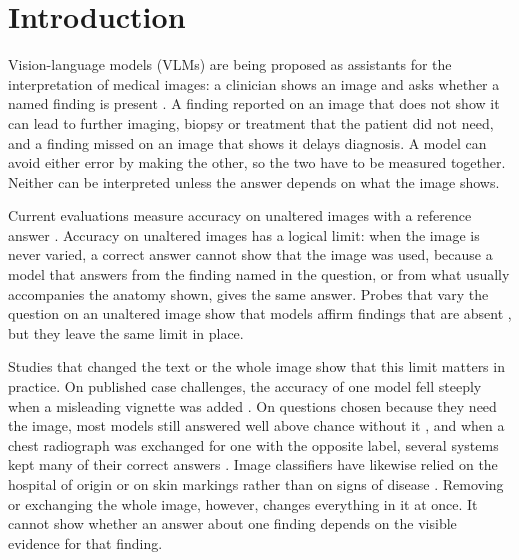 \section{Introduction}\label{sec:intro}

Vision-language models (VLMs) are being proposed as assistants for the interpretation of medical images: a clinician shows an image and asks whether a named finding is present \citep{sellergren2025medgemma,xu2025lingshu,chen2024huatuogpt}. A finding reported on an image that does not show it can lead to further imaging, biopsy or treatment that the patient did not need, and a finding missed on an image that shows it delays diagnosis. A model can avoid either error by making the other, so the two have to be measured together. Neither can be interpreted unless the answer depends on what the image shows.

Current evaluations measure accuracy on unaltered images with a reference answer \citep{lau2018vqarad,liu2021slake,he2020pathvqa}. Accuracy on unaltered images has a logical limit: when the image is never varied, a correct answer cannot show that the image was used, because a model that answers from the finding named in the question, or from what usually accompanies the anatomy shown, gives the same answer. Probes that vary the question on an unaltered image show that models affirm findings that are absent \citep{li2023pope,yan2024probmed}, but they leave the same limit in place.

Studies that changed the text or the whole image show that this limit matters in practice. On published case challenges, the accuracy of one model fell steeply when a misleading vignette was added \citep{buckley2026text}. On questions chosen because they need the image, most models still answered well above chance without it \citep{gu2025illusion}, and when a chest radiograph was exchanged for one with the opposite label, several systems kept many of their correct answers \citep{lotfinia2026image}. Image classifiers have likewise relied on the hospital of origin or on skin markings rather than on signs of disease \citep{zech2018variable,degrave2021shortcuts,winkler2019markings,oakden2020hidden,geirhos2020shortcut}. Removing or exchanging the whole image, however, changes everything in it at once. It cannot show whether an answer about one finding depends on the visible evidence for that finding.

